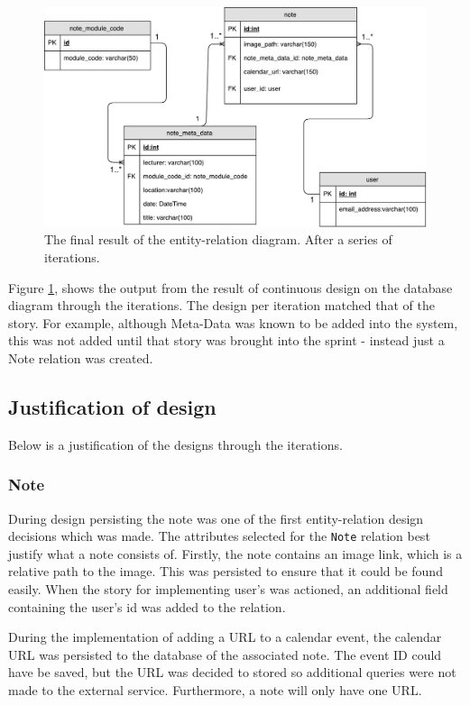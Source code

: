 \begin{figure}[h]
  \centering
  \includegraphics[scale=0.5]{images/database_diagram}
  \caption{The final result of the entity-relation diagram. After a series of iterations.}
  \label{fig:database}
\end{figure}

Figure \ref{fig:database}, shows the output from the result of continuous design on the database diagram through the iterations. The design per iteration matched that of the story. For example, although Meta-Data was known to be added into the system, this was not added until that story was brought into the sprint - instead just a Note relation was created.

\subsection{Justification of design}
Below is a justification of the designs through the iterations.
\subsubsection{Note}
During design persisting the note was one of the first entity-relation design decisions which was made. The attributes selected for the \texttt{Note} relation best justify what a note consists of. Firstly, the note contains an image link, which is a relative path to the image. This was persisted to ensure that it could be found easily. When the story for implementing user's was actioned, an additional field containing the user's id was added to the relation.

During the implementation of adding a URL to a calendar event, the calendar URL was persisted to the database of the associated note. The event ID could have be saved, but the URL was decided to stored so additional queries were not made to the external service. Furthermore, a note will only have one URL.


